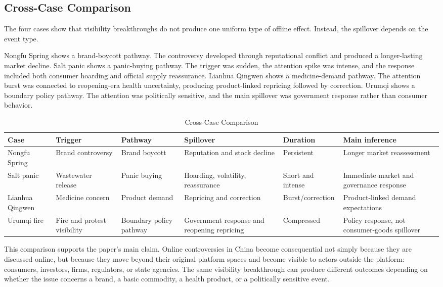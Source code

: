 \documentclass[conference]{IEEEtran}
\begin{document}
\subsection{Cross-Case Comparison}
The four cases show that visibility breakthroughs do not produce one uniform type of offline effect. Instead, the spillover depends on the event type.

Nongfu Spring shows a brand-boycott pathway. The controversy developed through reputational conflict and produced a longer-lasting market decline. Salt panic shows a panic-buying pathway. The trigger was sudden, the attention spike was intense, and the response included both consumer hoarding and official supply reassurance. Lianhua Qingwen shows a medicine-demand pathway. The attention burst was connected to reopening-era health uncertainty, producing product-linked repricing followed by correction. Urumqi shows a boundary policy pathway. The attention was politically sensitive, and the main spillover was government response rather than consumer behavior.

\begin{table}[!t]
\centering
\caption{Cross-Case Comparison}
\label{tab:cross_case}
{\footnotesize
\setlength{\tabcolsep}{4pt}
\begin{tabular}{p{}p{}p{}p{}p{}p{}}
\toprule
Case & Trigger & Pathway & Spillover & Duration & Main inference \\
\midrule
Nongfu Spring & Brand controversy & Brand boycott & Reputation and stock decline & Persistent & Longer market reassessment \\
Salt panic & Wastewater release & Panic buying & Hoarding, volatility, reassurance & Short and intense & Immediate market and governance response \\
Lianhua Qingwen & Medicine concern & Product demand & Repricing and correction & Burst/correction & Product-linked demand expectations \\
Urumqi fire & Fire and protest visibility & Boundary policy pathway & Government response and reopening repricing & Compressed & Policy response, not consumer-goods spillover \\
\bottomrule
\end{tabular}
}
\end{table}

This comparison supports the paper's main claim. Online controversies in China become consequential not simply because they are discussed online, but because they move beyond their original platform spaces and become visible to actors outside the platform: consumers, investors, firms, regulators, or state agencies. The same visibility breakthrough can produce different outcomes depending on whether the issue concerns a brand, a basic commodity, a health product, or a politically sensitive event.
\end{document}
